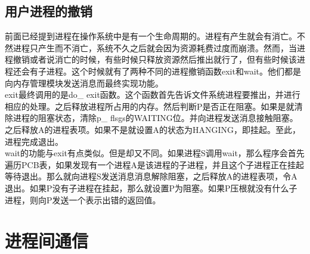 \documentclass[UTF8,nofonts,cs4size]{ctexrep}
\begin{document}
\subsection{用户进程的撤销}
前面已经提到进程在操作系统中是有一个生命周期的。进程有产生就会有消亡。不然进程只产生而不消亡，系统不久之后就会因为资源耗费过度而崩溃。然而，当进程撤销或者说消亡的时候，有些时候只释放资源然后推出就行了，但有些时候该进程还会有子进程。这个时候就有了两种不同的进程撤销函数exit和wait。他们都是向内存管理模块发送消息而最终实现功能。
\\
\indent 
exit最终调用的是do\_ exit函数。这个函数首先告诉文件系统进程要推出，并进行相应的处理。之后释放进程所占用的内存。然后判断P是否正在阻塞。如果是就清除进程的阻塞状态，清除p\_ flsgs的WAITING位。并向进程发送消息接触阻塞。之后释放A的进程表项。如果不是就设置A的状态为HANGING，即挂起。至此，进程完成退出。
\\
\indent  wait的功能与exit有点类似。但是却又不同。如果进程S调用wait，那么程序会首先遍历PCB表，如果发现有一个进程A是该进程的子进程，并且这个子进程正在挂起等待退出。那么就向进程S发送消息消息解除阻塞，之后释放A的进程表项，令A退出。如果P没有子进程在挂起，那么就设置P为阻塞。如果P压根就没有什么子进程，则向P发送一个表示出错的返回值。
\section{进程间通信}
\end{document}
